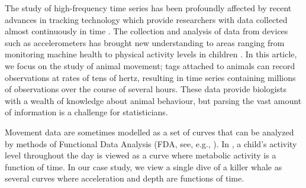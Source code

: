 The study of high-frequency time series has been profoundly affected by recent advances in tracking technology which provide researchers with data collected almost continuously in time \citep{Hooten:2017}.
The collection and analysis of data from devices such as accelerometers has brought new understanding to areas ranging from monitoring machine health \citep{Getman:2009} to physical activity levels in children \citep{Morris:2007}.
In this article, we focus on the study of animal movement; tags attached to animals can record observations at rates of tens of hertz, resulting in time series containing millions of observations over the course of several hours. These data provide biologists with a wealth of knowledge about animal behaviour, but parsing the vast amount of information is a challenge for statisticians.


Movement data are sometimes modelled as a set of curves that can be analyzed by methods of Functional Data Analysis (FDA, see, e.g., \citealt{Ramsay:2005}). In \cite{Morris:2007}, a child's activity level throughout the day is viewed as a curve where metabolic activity is a function of time. In our case study, we view a single dive of a killer whale as several curves where acceleration and depth are functions of time.

